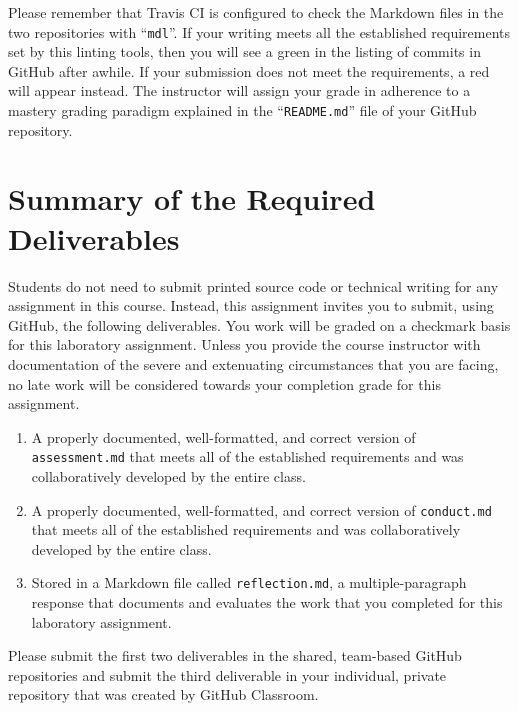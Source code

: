 \documentclass[11pt]{article}
\newcommand{\assessment}{\lstinline{assessment.md}}
\newcommand{\conduct}{\lstinline{conduct.md}}
\newcommand{\reflection}{\lstinline{reflection.md}}
\newcommand{\command}[1]{``\lstinline{#1}''}
\newcommand{\checkmark}{\ding{51}}
\newcommand{\naughtmark}{\ding{55}}
\begin{document}
Please remember that Travis CI is configured to check the Markdown files in the
two repositories with \command{mdl}.
%
If your writing meets all the established requirements set by this linting
tools, then you will see a green \checkmark{} in the listing of commits in
GitHub after awhile. If your submission does not meet the requirements, a red
\naughtmark{} will appear instead. The instructor will assign your grade in
adherence to a mastery grading paradigm explained in the \command{README.md}
file of your GitHub repository.

\section*{Summary of the Required Deliverables}

\noindent Students do not need to submit printed source code or technical
writing for any assignment in this course. Instead, this assignment invites you
to submit, using GitHub, the following deliverables. You work will be graded on
a checkmark basis for this laboratory assignment.
%
Unless you provide the course instructor with documentation of the severe and
extenuating circumstances that you are facing, no late work will be considered
towards your completion grade for this assignment.

\begin{enumerate}

\setlength{\itemsep}{-.01in}

\item A properly documented, well-formatted, and correct version of
  \assessment{} that meets all of the established requirements and was
  collaboratively developed by the entire class.

\item A properly documented, well-formatted, and correct version of
  \conduct{} that meets all of the established requirements and was
  collaboratively developed by the entire class.

\item Stored in a Markdown file called \reflection{}, a multiple-paragraph
  response that documents and evaluates the work that you completed for this
  laboratory assignment.

\end{enumerate}

\noindent Please submit the first two deliverables in the shared, team-based
GitHub repositories and submit the third deliverable in your individual, private
repository that was created by GitHub Classroom.
\end{document}
